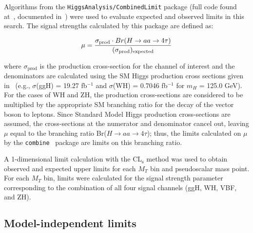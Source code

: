 Algorithms from the \texttt{HiggsAnalysis/CombinedLimit} package (full code found at~\cite{CombinedGitHub}, documented in~\cite{CombinedTwiki}) were used to evaluate expected and observed limits in this search. The signal strengths calculated by this package are defined as:

\begin{equation}
\mu = \frac{\sigma_{\text{prod}}\cdot Br(H\rightarrow aa \rightarrow4\tau)}{(\sigma_{\text{prod}})_{\text{expected}}} \\
\label{eq:rDefinition}
\end{equation}

where $\sigma_{\text{prod}}$ is the production cross-section for the channel of interest and the denominators are calculated using the SM Higgs production cross sections given in~\cite{LHCHXSWG} (e.g., $\sigma$(ggH) = 19.27 fb$^{-1}$ and $\sigma$(WH) = 0.7046 fb$^{-1}$ for $m_{H}$ = 125.0 GeV). For the cases of WH and ZH, the production cross-sections are considered to be multiplied by the appropriate SM branching ratio for the decay of the vector boson to leptons. Since Standard Model Higgs production cross-sections are assumed, the cross-sections at the numerator and denominator cancel out, leaving $\mu$ equal to the branching ratio Br($H\rightarrow$$aa$$\rightarrow4\tau$); thus, the limits calculated on $\mu$ by the \texttt{combine}~\cite{springerlink:10.1140/epjc/s10052-011-1554-0} package are limits on this branching ratio.

A 1-dimensional limit calculation with the $\text{CL}_{\text{s}}$ method was used to obtain observed and expected upper limits for each $M_{T}$ bin and pseudoscalar mass point. For each $M_{T}$ bin, limits were calculated for the signal strength parameter corresponding to the combination of all four signal channels (ggH, WH, VBF, and ZH).

\subsection{Model-independent limits\label{sec:results-limits}}

